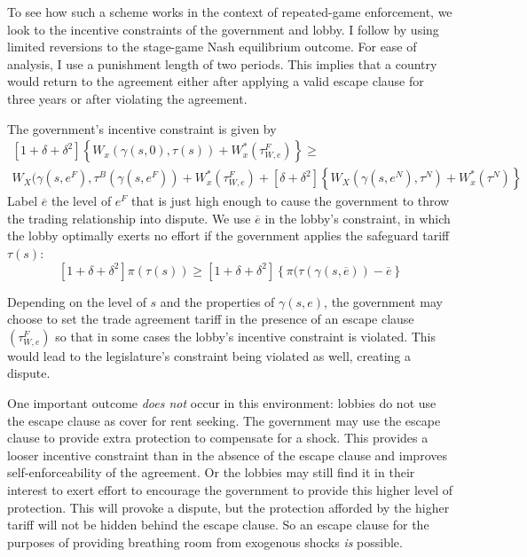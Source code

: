 \documentclass[12pt]{article}
\newcommand{\ov}{\overline}
\newcommand{\ga}{\gamma}
\newcommand{\de}{\delta}
\begin{document}
To see how such a scheme works in the context of repeated-game enforcement, we look to the incentive constraints of the government and lobby. I follow \Textcite{buzard2013a} by using limited reversions to the stage-game Nash equilibrium outcome. For ease of analysis, I use a punishment length of two periods. This implies that a country would return to the agreement either after applying a valid escape clause for three years or after violating the agreement.

The government's incentive constraint is given by
  \begin{multline}
    \left[1+ \de +\de^2 \right] \left\{W_x(\ga(s,0),\tau(s)) + W_x^*(\tau^F_{W,e}) \right\} \geq \\ W_X(\ga(s,e^F),\tau^B(\ga(s,e^F)) + W_x^*(\tau^F_{W,e}) + \left[\de +\de^2 \right] \left\{W_X(\ga(s,e^N),\tau^N) + W_x^*(\tau^N) \right\}
		\label{exp:govincentEC}
  \end{multline}
Label $\ov{e}$ the level of $e^F$ that is just high enough to cause the government to throw the trading relationship into dispute. We use $\ov{e}$ in the lobby's constraint, in which the lobby optimally exerts no effort if the government applies the safeguard tariff $\tau(s)$:
\begin{equation}
  \left[1+ \de +\de^2 \right] \pi(\tau(s)) \geq \left[1+ \de +\de^2 \right] \left\{\pi(\tau(\ga(s,\ov{e})) - \ov{e} \right\}
	\label{exp:lobbyEC}
\end{equation}

Depending on the level of $s$ and the properties of $\ga(s,e)$, the government may choose to set the trade agreement tariff in the presence of an escape clause $\left(\tau^F_{W,e}\right)$ so that in some cases the lobby's incentive constraint is violated. This would lead to the legislature's constraint being violated as well, creating a dispute. 

One important outcome \textit{does not} occur in this environment: lobbies do not use the escape clause as cover for rent seeking. The government may use the escape clause to provide extra protection to compensate for a shock. This provides a looser incentive constraint than in the absence of the escape clause and improves self-enforceability of the agreement. Or the lobbies may still find it in their interest to exert effort to encourage the government to provide this higher level of protection. This will provoke a dispute, but the protection afforded by the higher tariff will not be hidden behind the escape clause. So an escape clause for the purposes of providing breathing room from exogenous shocks \textit{is} possible.
\end{document}
